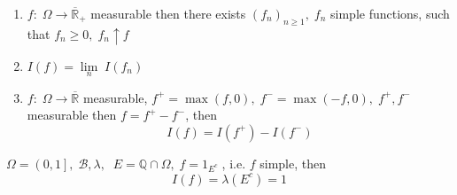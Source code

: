 \begin{proposition}
	\text{}
	\begin{enumerate}
		\item $f:\;\Omega  \to {\overline {\mathbb{R}} _ + }$ measurable then there exists ${\left( {{f_n}} \right)_{n \geqslant 1}},\;{f_n}$ simple functions, such that ${f_n} \geqslant 0,\;{f_n} \uparrow f$
		\item $I\left( f \right) = \mathop {\lim }\limits_n \;I\left( {{f_n}} \right)$
		\item $f:\;\Omega  \to \overline {\mathbb{R}} $ measurable, ${f^ + } = \max \left( {f,0} \right),\;{f^ - } = \max \left( { - f,0} \right),\;{f^ + },{f^ - }$ measurable then $f = {f^ + } - {f^ - }$, then 
		\begin{equation}
		I\left( f \right) = I\left( {{f^ + }} \right) - I\left( {{f^ - }} \right)
		\label{eq10.18}
		\end{equation}
	\end{enumerate}
	\label{prop10.3}
\end{proposition}

\begin{example}
	$\Omega  = \left( {0,1} \right],\;{\mathcal{B}},\lambda ,\;\;E = \mathbb{Q} \cap \Omega ,\;f = {1_{{E^c}}}\;$, i.e.  $ f $ simple, then
	\begin{equation}
	I\left( f \right) = \lambda \left( {{E^c}} \right) = 1
	\label{eq10.19}
	\end{equation} 
\end{example}